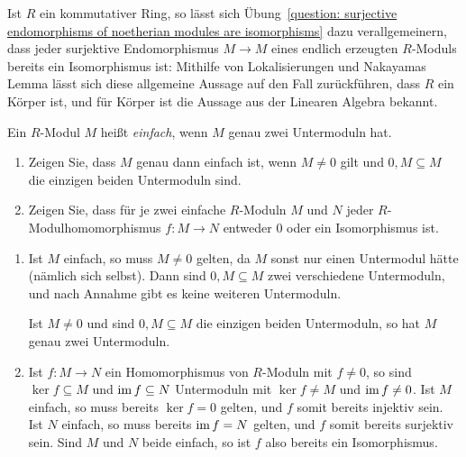 \begin{remark*}
  Ist $R$ ein kommutativer Ring, so lässt sich Übung~\ref{question: surjective endomorphisms of noetherian modules are isomorphisms} dazu verallgemeinern, dass jeder surjektive Endomorphismus $M \to M$ eines endlich erzeugten $R$-Moduls bereits ein Isomorphismus ist:
  Mithilfe von Lokalisierungen und Nakayamas Lemma lässt sich diese allgemeine Aussage auf den Fall zurückführen, dass $R$ ein Körper ist, und für Körper ist die Aussage aus der Linearen Algebra bekannt.
\end{remark*}


\begin{question}[subtitle = Ein Lemma von Schur]
  Ein $R$-Modul $M$ heißt \emph{einfach}, wenn $M$ genau zwei Untermoduln hat.
  \begin{enumerate}
    \item
      Zeigen Sie, dass $M$ genau dann einfach ist, wenn $M \neq 0$ gilt und $0, M \subseteq M$ die einzigen beiden Untermoduln sind.
    \item
      Zeigen Sie, dass für je zwei einfache $R$-Moduln $M$ und $N$ jeder $R$-Mo\-dul\-ho\-mo\-mor\-phis\-mus $f \colon M \to N$ entweder $0$ oder ein Isomorphismus ist.
  \end{enumerate}
\end{question}


\begin{solution}
  \begin{enumerate}
    \item
      Ist $M$ einfach, so muss $M \neq 0$ gelten, da $M$ sonst nur einen Untermodul hätte (nämlich sich selbst).
      Dann sind $0, M \subseteq M$ zwei verschiedene Untermoduln, und nach Annahme gibt es keine weiteren Untermoduln.
      
      Ist $M \neq 0$ und sind $0, M \subseteq M$ die einzigen beiden Untermoduln, so hat $M$ genau zwei Untermoduln.
    \item
      Ist $f \colon M \to N$ ein Homomorphismus von $R$-Moduln mit $f \neq 0$, so sind $\ker f \subseteq M$ und $\operatorname{im} f \subseteq N$ Untermoduln mit $\ker f \neq M$ und $\operatorname{im} f \neq 0$.
      Ist $M$ einfach, so muss bereits $\ker f = 0$ gelten, und $f$ somit bereits injektiv sein.
      Ist $N$ einfach, so muss bereits $\operatorname{im} f = N$ gelten, und $f$ somit bereits surjektiv sein.
      Sind $M$ und $N$ beide einfach, so ist $f$ also bereits ein Isomorphismus.
  \end{enumerate}
\end{solution}


